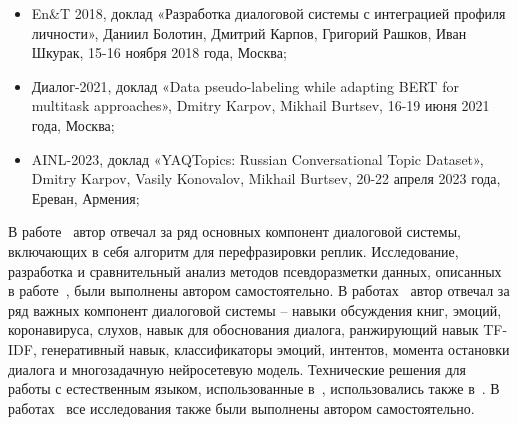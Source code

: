{\probation}
\begin{itemize}
   \item En\&T 2018, доклад «Разработка диалоговой системы с интеграцией профиля личности», Даниил Болотин, Дмитрий Карпов, Григорий Рашков, Иван Шкурак, 15-16 ноября 2018 года, Москва;
   \item Диалог-2021, доклад «Data pseudo-labeling while adapting BERT for multitask approaches», Dmitry Karpov, Mikhail Burtsev, 16-19 июня 2021 года, Москва;
   \item AINL-2023, доклад «YAQTopics: Russian Conversational Topic Dataset», Dmitry Karpov, Vasily Konovalov, Mikhail Burtsev, 20-22 апреля 2023 года, Ереван, Армения;
\end{itemize}%


{\contribution} В работе~\cite{Болотин_Карпов_Рашков_Шкурак_2019} автор отвечал за ряд основных компонент диалоговой системы, включающих в себя алгоритм для перефразировки реплик. Исследование, разработка и сравнительный анализ методов псевдоразметки данных, описанных в работе~\cite{pseudolabel}, были выполнены автором самостоятельно. В работах~\cite{dream1,dream1_trudy,dream2} автор отвечал за ряд важных компонент диалоговой системы -- навыки обсуждения книг, эмоций, коронавируса, слухов, навык для обоснования диалога, ранжирующий навык TF-IDF, генеративный навык, классификаторы эмоций, интентов, момента остановки диалога и многозадачную нейросетевую модель. Технические решения для работы с естественным языком, использованные в~\cite{dream1,dream1_trudy,dream2}, использовались также в~\cite{Дуплякин_Дмитрий_Ондар_Ушаков_2021}. В работах~\cite{rumtl,enmtl,rutopics} все исследования также были выполнены автором самостоятельно. 

